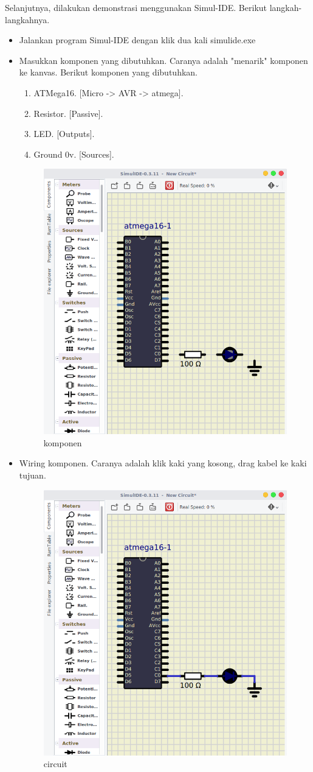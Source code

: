 \documentclass[12pt,]{article}
\begin{document}
	Selanjutnya, dilakukan demonstrasi menggunakan Simul-IDE.
	Berikut langkah-langkahnya.
	\begin{itemize}
		\item Jalankan program Simul-IDE dengan klik dua kali simulide.exe
		
		\item Masukkan komponen yang dibutuhkan.
		Caranya adalah "menarik" komponen ke kanvas.
		Berikut komponen yang dibutuhkan.
		\begin{enumerate}
			\item ATMega16. [Micro -> AVR -> atmega].
			\item Resistor. [Passive].
			\item LED. [Outputs].
			\item Ground 0v. [Sources].
		\end{enumerate}
	
		\begin{figure}[H]
			\centering
			\includegraphics[width=0.7\linewidth]{images/tessim_0}
			\caption{komponen}
		\end{figure}
	
		\newpage
		\item Wiring komponen.
		Caranya adalah klik kaki yang kosong, drag kabel ke kaki tujuan.
	
		\begin{figure}[H]
			\centering
			\includegraphics[width=0.5\linewidth]{images/tessim_1}
			\caption{circuit}
		\end{figure}
	

\end{itemize}
\end{document}
